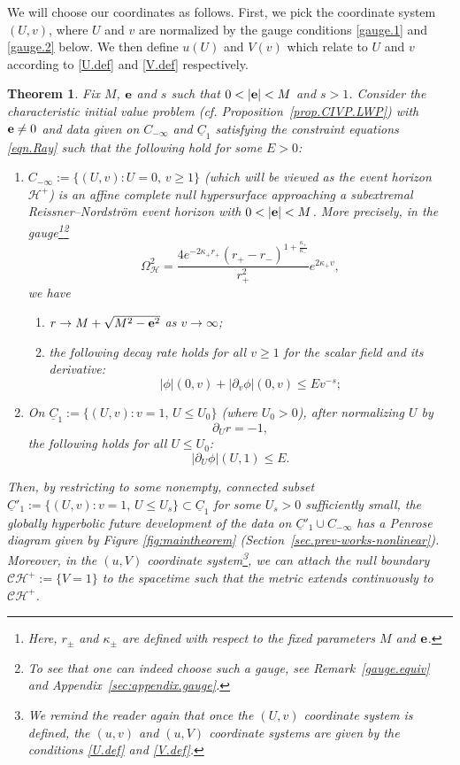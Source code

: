 \documentclass[10pt, reqno]{amsart}
\newtheorem{theorem}{Theorem}[section]
\theoremstyle{definition}
\theoremstyle{remark}
\numberwithin{equation}{section}
\newcommand{\rd}{\partial}
\newcommand{\0}{\emptyset}
\newcommand{\Omg}{\Omega}
\newcommand{\bfe}{{\bf e}}
\newcommand{\calC}{\mathcal C}
\newcommand{\calH}{\mathcal H}
\newcommand{\f}{\frac}
\newcommand{\CH}{\calC \calH^{+}}		%
\newcommand{\EH}{\calH^{+}}
\newcommand{\e}{\bfe}							%
\begin{document}
We will choose our coordinates as follows. First, we pick the coordinate system $(U,v)$, where $U$ and $v$ are normalized by the gauge conditions \eqref{gauge.1} and \eqref{gauge.2} below. We then define $u(U)$ and $V(v)$ which relate to $U$ and $v$ according to \eqref{U.def} and \eqref{V.def} respectively.

\begin{theorem}\label{main.theorem.C0.stability}
Fix $M$, ${\bf e}$ and $s$ such that $0<|{\bf e}|<M$ and $s>1$. Consider the characteristic initial value problem (cf. Proposition~\ref{prop.CIVP.LWP}) with $\e\neq 0$ and data given on $C_{-\infty}$ and $\underline{C}_1$ satisfying the constraint equations \eqref{eqn.Ray} such that the following hold for some $E>0$: 
\begin{enumerate}
\item $C_{-\infty}:=\{(U,v): U=0,\, v\geq 1\}$ (which will be viewed as the event horizon $\EH$) is an affine complete null hypersurface approaching a subextremal Reissner--Nordstr\"om event horizon with $0<|{\bf e}|<M$. More precisely, in the gauge\footnote{Here, $r_\pm$ and $\kappa_\pm$ are defined with respect to the fixed parameters $M$ and ${\bf e}$.}\footnote{To see that one can indeed choose such a gauge, see Remark~\ref{gauge.equiv} and Appendix~\ref{sec:appendix.gauge}.} 
\begin{equation}\label{gauge.1}
\Omg^2_{\mathcal H}=\f{4e^{-2\kappa_+ r_+}(r_+-r_-)^{1+\f{\kappa_+}{\kappa_-}}}{r_+^2}e^{2\kappa_+ v},
\end{equation}
we have
\begin{enumerate}
\item $r\to M+\sqrt{M^2-{\bf e}^2}$ as $v\to \infty$;
\item the following decay rate holds for all $v\geq 1$ for the scalar field and its derivative:
\begin{equation}\label{phi.EH.decay}
|\phi|(0,v)+|\rd_v\phi|(0,v)\leq E v^{-s};
\end{equation}
\end{enumerate}
\item On $\underline{C}_1:=\{(U,v): v=1,\, U\leq U_0\}$ (where $U_0>0$), after normalizing $U$ by 
\begin{equation}\label{gauge.2}
\rd_U r=-1,
\end{equation}
the following holds for all $U\leq U_0$:
\begin{equation}\label{rdUphi.initial}
|\rd_U\phi|(U,1)\leq E.
\end{equation}
\end{enumerate}
Then, by restricting to some nonempty, connected subset $\underline{C}'_1:=\{(U,v):v=1,\,U\leq U_s\}\subset \underline{C}_1$ for some $U_s>0$ sufficiently small, the globally hyperbolic future development of the data on $\underline{C}'_1\cup C_{-\infty}$ has a Penrose diagram given by Figure \ref{fig:maintheorem} (Section~\ref{sec.prev-works-nonlinear}). Moreover, in the $(u,V)$ coordinate system\footnote{We remind the reader again that once the $(U,v)$ coordinate system is defined, the $(u,v)$ and $(u,V)$ coordinate systems are given by the conditions \eqref{U.def} and \eqref{V.def}.}, we can attach the null boundary $\CH:=\{V=1\}$ to the spacetime such that the metric extends continuously to $\CH$. 


\end{theorem}
\end{document}
